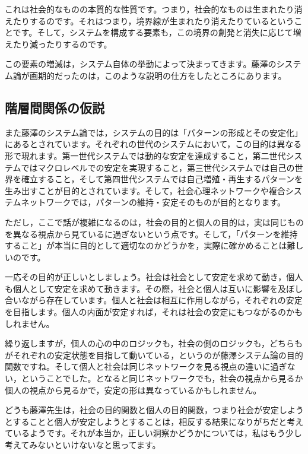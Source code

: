 \documentclass{ltjsbook}
\begin{document}
これは社会的なものの本質的な性質です。つまり，社会的なものは生まれたり消えたりするのです。それはつまり，境界線が生まれたり消えたりているということです。そして，システムを構成する要素も，この境界の創発と消失に応じて増えたり減ったりするのです。

この要素の増減は，システム自体の挙動によって決まってきます。藤澤のシステム論が画期的だったのは，このような説明の仕方をしたところにあります。
\subsection{階層間関係の仮説}

また藤澤のシステム論では，システムの目的は「パターンの形成とその安定化」にあるとされています。それぞれの世代のシステムにおいて，この目的は異なる形で現れます。第一世代システムでは動的な安定を達成すること，第二世代システムではマクロレベルでの安定を実現すること，第三世代システムでは自己の世界を確立すること，そして第四世代システムでは自己増殖・再生するパターンを生み出すことが目的とされています。そして，社会心理ネットワークや複合システムネットワークでは，パターンの維持・安定そのものが目的となります。

ただし，ここで話が複雑になるのは，社会の目的と個人の目的は，実は同じものを異なる視点から見ているに過ぎないという点です。そして，「パターンを維持すること」が本当に目的として適切なのかどうかを，実際に確かめることは難しいのです。

一応その目的が正しいとしましょう。社会は社会として安定を求めて動き，個人も個人として安定を求めて動きます。その際，社会と個人は互いに影響を及ぼし合いながら存在しています。個人と社会は相互に作用しながら，それぞれの安定を目指します。個人の内面が安定すれば，それは社会の安定にもつながるのかもしれません。

繰り返しますが，個人の心の中のロジックも，社会の側のロジックも，どちらもがそれぞれの安定状態を目指して動いている，というのが藤澤システム論の目的関数ですね。そして個人と社会は同じネットワークを見る視点の違いに過ぎない，ということでした。となると同じネットワークでも，社会の視点から見るか個人の視点から見るかで，安定の形は異なっているかもしれません。

どうも藤澤先生は，社会の目的関数と個人の目的関数，つまり社会が安定しようとすることと個人が安定しようとすることは，相反する結果になりがちだと考えているようです。それが本当か，正しい洞察かどうかについては，私はもう少し考えてみないといけないなと思ってます。
\end{document}
